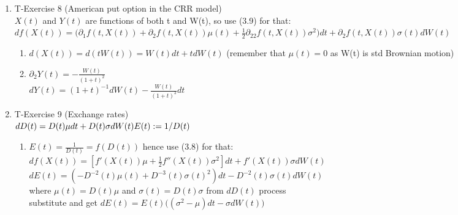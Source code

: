 \documentclass[11pt]{article}
\begin{document}
\begin{enumerate} %
\item T-Exercise 8 (American put option in the CRR model)
\\[5pt] $X(t)$ and $Y(t)$ are functions of both t and W(t), so use (3.9) for that: 
\\[5pt] $df(X(t))=\bigg(\partial_1 f(t, X(t)) +  \partial_2 f(t,X(t))\mu(t) + \frac{1}{2}\partial_{22}f(t,X(t))\sigma^2\bigg)dt+\partial_2f(t, X(t))\sigma(t) dW(t)$	

	\begin{enumerate} %
		\item $d(X(t))=d(tW(t))=W(t)dt+tdW(t)$ (remember that $\mu(t) = 0$ as W(t) is std Brownian motion)
	
		\item $\partial_2 Y(t)=-\frac{W(t)}{(1+t)^2}$
		\\[5pt] $dY(t)=(1+t)^{-1}dW(t)-\frac{W(t)}{(1+t)^2}dt$
	\end{enumerate}
	
\item T-Exercise 9 (Exchange rates)
\\[5pt] $dD(t)=D(t)\mu dt+D(t)\sigma dW(t) 
\\ E(t):=1/D(t)$
	\begin{enumerate} %
		\item $E(t)=\frac{1}{D(t)}=f(D(t))$ hence use (3.8) for that: 
		\\[5pt] $df(X(t))=[f'(X(t))\mu+\frac{1}{2}f''(X(t))\sigma^2]dt+f'(X(t))\sigma dW(t)$ 
		\\[5pt] $dE(t)=(-D^{-2}(t)\mu (t)+D^{-3}(t)\sigma(t)^2)dt-D^{-2}(t)\sigma(t) dW(t)$
		\\[5pt] where $\mu (t) = D(t)\mu$ and $\sigma(t) = D(t)\sigma$ from $dD(t)$ process
		\\[5pt] substitute and get $dE(t) = E(t)\bigg( (\sigma^2 - \mu)dt-\sigma dW(t) \bigg)$ 
		\\[5pt]
		

\end{enumerate}
\end{enumerate}
\end{document}
